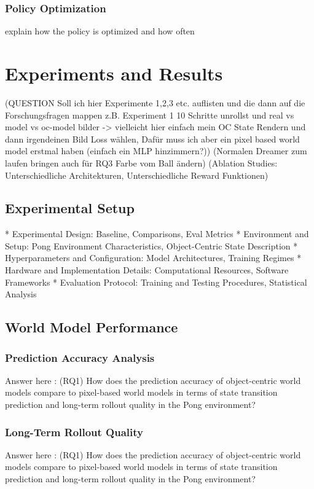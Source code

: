 \documentclass[
	english,
	ruledheaders=section,
	class=report,
	thesis={type=master},
	accentcolor=9c,
	custommargins=true,
	marginpar=false,
	parskip=half-,
	fontsize=11pt,
]{tudapub}
\begin{document}
\subsection{Policy Optimization}
\label{subsec:policy_optimization}
explain how the policy is optimized and how often

\chapter{Experiments and Results}
\label{chap:experiments}
(QUESTION Soll ich hier Experimente 1,2,3 etc. auflisten und die dann auf die Forschungsfragen mappen
z.B. Experiment 1 10 Schritte unrollst und real vs model vs oc-model bilder -> vielleicht hier einfach
mein OC State Rendern und dann irgendeinen Bild Loss wählen, Dafür muss ich aber ein pixel based world model erstmal haben (einfach ein MLP hinzimmern?))
(Normalen Dreamer zum laufen bringen auch für RQ3 Farbe vom Ball ändern)
(Ablation Studies: Unterschiedliche Architekturen, Unterschiedliche Reward Funktionen)


\section{Experimental Setup}
\label{sec:exp_setup}
* Experimental Design: Baseline, Comparisons, Eval Metrics
* Environment and Setup: Pong Environment Characteristics, Object-Centric State Description 
* Hyperparameters and Configuration: Model Architectures, Training Regimes
* Hardware and Implementation Details: Computational Resources, Software Frameworks
* Evaluation Protocol: Training and Testing Procedures, Statistical Analysis

\section{World Model Performance}
\label{sec:world_model_perf}

\subsection{Prediction Accuracy Analysis}
\label{subsec:prediction_accuracy}
Answer here : (RQ1) How does the prediction accuracy of object-centric world models compare to pixel-based world models in terms of state transition prediction and long-term rollout quality in the Pong environment?

\subsection{Long-Term Rollout Quality}
\label{subsec:rollout_quality}
Answer here : (RQ1) How does the prediction accuracy of object-centric world models compare to pixel-based world models in terms of state transition prediction and long-term rollout quality in the Pong environment?
\end{document}
